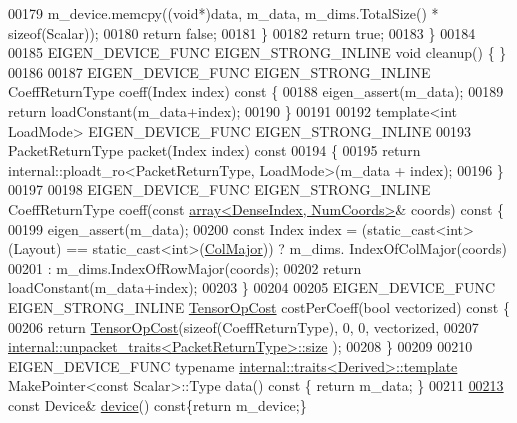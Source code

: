 \begin{DoxyCode}
00179       m\_device.memcpy((\textcolor{keywordtype}{void}*)data, m\_data, m\_dims.TotalSize() * \textcolor{keyword}{sizeof}(Scalar));
00180       \textcolor{keywordflow}{return} \textcolor{keyword}{false};
00181     \}
00182     \textcolor{keywordflow}{return} \textcolor{keyword}{true};
00183   \}
00184 
00185   EIGEN\_DEVICE\_FUNC EIGEN\_STRONG\_INLINE \textcolor{keywordtype}{void} cleanup() \{ \}
00186 
00187   EIGEN\_DEVICE\_FUNC EIGEN\_STRONG\_INLINE CoeffReturnType coeff(Index index)\textcolor{keyword}{ const }\{
00188     eigen\_assert(m\_data);
00189     \textcolor{keywordflow}{return} loadConstant(m\_data+index);
00190   \}
00191 
00192   \textcolor{keyword}{template}<\textcolor{keywordtype}{int} LoadMode> EIGEN\_DEVICE\_FUNC EIGEN\_STRONG\_INLINE
00193   PacketReturnType packet(Index index)\textcolor{keyword}{ const}
00194 \textcolor{keyword}{  }\{
00195     \textcolor{keywordflow}{return} internal::ploadt\_ro<PacketReturnType, LoadMode>(m\_data + index);
00196   \}
00197 
00198   EIGEN\_DEVICE\_FUNC EIGEN\_STRONG\_INLINE CoeffReturnType coeff(\textcolor{keyword}{const} 
      \hyperlink{class_eigen_1_1array}{array<DenseIndex, NumCoords>}& coords)\textcolor{keyword}{ const }\{
00199     eigen\_assert(m\_data);
00200     \textcolor{keyword}{const} Index index = (\textcolor{keyword}{static\_cast<}\textcolor{keywordtype}{int}\textcolor{keyword}{>}(Layout) == static\_cast<int>(\hyperlink{group__enums_ggaacded1a18ae58b0f554751f6cdf9eb13a0cbd4bdd0abcfc0224c5fcb5e4f6669a}{ColMajor})) ? m\_dims.
      IndexOfColMajor(coords)
00201                         : m\_dims.IndexOfRowMajor(coords);
00202     \textcolor{keywordflow}{return} loadConstant(m\_data+index);
00203   \}
00204 
00205   EIGEN\_DEVICE\_FUNC EIGEN\_STRONG\_INLINE \hyperlink{class_eigen_1_1_tensor_op_cost}{TensorOpCost} costPerCoeff(\textcolor{keywordtype}{bool} vectorized)\textcolor{keyword}{ const }\{
00206     \textcolor{keywordflow}{return} \hyperlink{class_eigen_1_1_tensor_op_cost}{TensorOpCost}(\textcolor{keyword}{sizeof}(CoeffReturnType), 0, 0, vectorized,
00207                         \hyperlink{struct_eigen_1_1internal_1_1unpacket__traits}{internal::unpacket\_traits<PacketReturnType>::size}
      );
00208   \}
00209 
00210   EIGEN\_DEVICE\_FUNC \textcolor{keyword}{typename} \hyperlink{struct_eigen_1_1internal_1_1traits}{internal::traits<Derived>::template} 
      MakePointer<const Scalar>::Type data()\textcolor{keyword}{ const }\{ \textcolor{keywordflow}{return} m\_data; \}
00211 
\hyperlink{struct_eigen_1_1_tensor_evaluator_3_01const_01_derived_00_01_device_01_4_ac5b59eb35ea904aca2c6e6fa6e719ff4}{00213}   \textcolor{keyword}{const} Device& \hyperlink{struct_eigen_1_1_tensor_evaluator_3_01const_01_derived_00_01_device_01_4_ac5b59eb35ea904aca2c6e6fa6e719ff4}{device}()\textcolor{keyword}{ const}\{\textcolor{keywordflow}{return} m\_device;\}

\end{DoxyCode}
